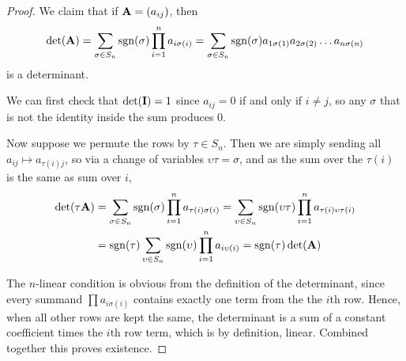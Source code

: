 \begin{proof}
    We claim that if \(\vb{A} = (a_{ij})\), then
    \begin{equation*}
        \det(\vb{A}) = \sum_{\sigma \in S_n}\operatorname{sgn}(\sigma)
        \prod_{i=1}^n a_{i\sigma(i)}
        = \sum_{\sigma \in S_n}\operatorname{sgn}(\sigma)
        a_{1\sigma(1)}a_{2\sigma(2)} \hdots a_{n\sigma(n)}
    \end{equation*}
    is a determinant.

    We can first check that \(\det(\vb{I}) = 1\)
    since \(a_{ij} = 0\) if and only if \(i \neq j\),
    so any \(\sigma\) that is not the identity
    inside the sum produces 0.

    Now suppose we permute the rows by \(\tau \in S_n\).
    Then we are simply sending all \(a_{ij} \mapsto a_{\tau(i)j}\),
    so via a change of variables \(\upsilon\tau = \sigma\),
    and as the sum over the \(\tau(i)\) is the same as sum over \(i\),
    \begin{align*}
        \det(\tau\vb{A}) &= \sum_{\sigma \in S_n} \operatorname{sgn}(\sigma)
        \prod_{i=1}^n a_{\tau(i)\sigma(i)}
        = \sum_{\upsilon \in S_n} \operatorname{sgn}(\upsilon\tau)
        \prod_{i=1}^n a_{\tau(i)\upsilon\tau(i)} \\
        &= \operatorname{sgn}(\tau) \sum_{\upsilon \in S_n} \operatorname{sgn}(\upsilon)
        \prod_{i=1}^n a_{i\upsilon(i)}
        = \operatorname{sgn}(\tau) \det(\vb{A})
    \end{align*}

    The \(n\)-linear condition is obvious
    from the definition of the determinant,
    since every summand \(\prod a_{i\sigma(i)}\)
    contains exactly one term from the the \(i\)th row.
    Hence, when all other rows are kept the same,
    the determinant is a sum of a constant coefficient
    times the \(i\)th row term,
    which is by definition, linear.
    Combined together this proves existence.

    \medskip


\end{proof}
